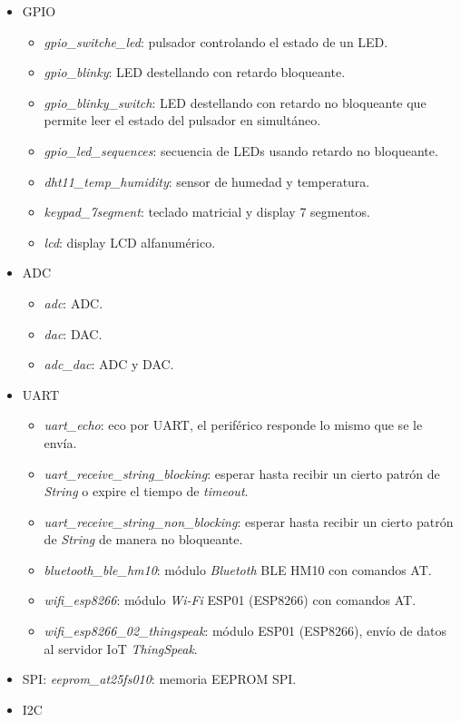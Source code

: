 \begin{itemize}
\item
GPIO
\begin{itemize}
\item \emph{gpio\_switche\_led}: pulsador controlando el estado de un LED.
\item \emph{gpio\_blinky}: LED destellando con retardo bloqueante.
\item \emph{gpio\_blinky\_switch}: LED destellando con retardo no bloqueante que permite leer el estado del pulsador en simultáneo.
\item \emph{gpio\_led\_sequences}: secuencia de LEDs usando retardo no bloqueante.
\item \emph{dht11\_temp\_humidity}: sensor de humedad y temperatura.
\item \emph{keypad\_7segment}: teclado matricial y display 7 segmentos.
\item \emph{lcd}: display LCD alfanumérico.
\end{itemize}
\item
ADC
\begin{itemize}
\item \emph{adc}: ADC.
\item \emph{dac}: DAC.
\item \emph{adc\_dac}: ADC y DAC.
\end{itemize}
\item
UART
\begin{itemize}
\item \emph{uart\_echo}: eco por UART, el periférico responde lo mismo que se le envía.
\item \emph{uart\_receive\_string\_blocking}: esperar hasta recibir un cierto patrón de \emph{String} o expire el tiempo de \emph{timeout}.
\item \emph{uart\_receive\_string\_non\_blocking}: esperar hasta recibir un cierto patrón de \emph{String} de manera no bloqueante.
\item \emph{bluetooth\_ble\_hm10}: módulo \emph{Bluetoth} BLE HM10 con comandos AT.
\item \emph{wifi\_esp8266}: módulo \emph{Wi-Fi} ESP01 (ESP8266) con comandos AT.
\item \emph{wifi\_esp8266\_02\_thingspeak}: módulo ESP01 (ESP8266), envío de datos al servidor IoT \emph{ThingSpeak}.
\end{itemize}
\item
SPI: \emph{eeprom\_at25fs010}: memoria EEPROM SPI.
\item
I2C
\begin{itemize}

\end{itemize}
\end{itemize}
